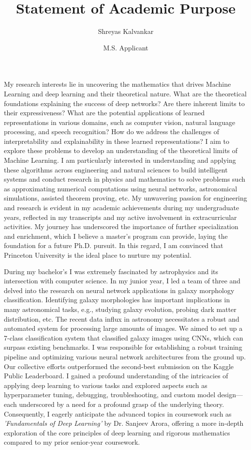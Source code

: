 \documentclass{article}
\title{Statement of Academic Purpose}
\author{Shreyas Kalvankar}
\date{M.S. Applicant}
\begin{document}
  \maketitle%
  \thispagestyle{empty}
My research interests lie in uncovering the mathematics that drives Machine
Learning and deep learning and their theoretical nature. What are the
theoretical foundations explaining the success of deep networks? Are there
inherent limits to their expressiveness? What are the potential applications of
learned representations in various domains, such as computer vision, natural
language processing, and speech recognition? How do we address the challenges of
interpretability and explainability in these learned representations? I aim to
explore these problems to develop an understanding of the theoretical limits of
Machine Learning. I am particularly interested in understanding and applying
these algorithms across engineering and natural sciences to build intelligent
systems and conduct research in physics and mathematics to solve problems such
as approximating numerical computations using neural networks, astronomical
simulations, assisted theorem proving, etc. My unwavering passion for
engineering and research is evident in my academic achievements during my
undergraduate years, reflected in my transcripts and my active involvement in
extracurricular activities. My journey has underscored the importance of further
specialization and enrichment, which I believe a master's program can provide,
laying the foundation for a future Ph.D. pursuit. In this regard, I am convinced
that Princeton University is the ideal place to nurture my potential.

During my bachelor's I was extremely fascinated by astrophysics and its
intersection with computer science. In my junior year, I led a team of three and
delved into the research on neural network applications in galaxy morphology
classification. Identifying galaxy morphologies has important implications in
many astronomical tasks, e.g., studying galaxy evolution, probing dark matter
distribution, etc. The recent data influx
in astronomy necessitates a robust and automated system for processing large
amounts of images. We aimed to set up a 7-class classification system that
classified galaxy images using CNNs, which can surpass existing benchmarks. I
was responsible for establishing a robust training pipeline and optimizing
various neural network architectures from the ground up. Our collective efforts
outperformed the second-best submission on the Kaggle Public Leaderboard. I
gained a profound understanding of the intricacies of applying deep learning to
various tasks and explored aspects such as hyperparameter tuning, debugging,
troubleshooting, and custom model design—each underscored by a need for a
profound grasp of the underlying theory. Consequently, I eagerly anticipate the
advanced topics in coursework such as \textit{'Fundamentals of Deep Learning'} by 
Dr. Sanjeev Arora, offering a more in-depth exploration of the core principles
of deep learning and rigorous mathematics compared to my prior senior-year
coursework.
\end{document}

